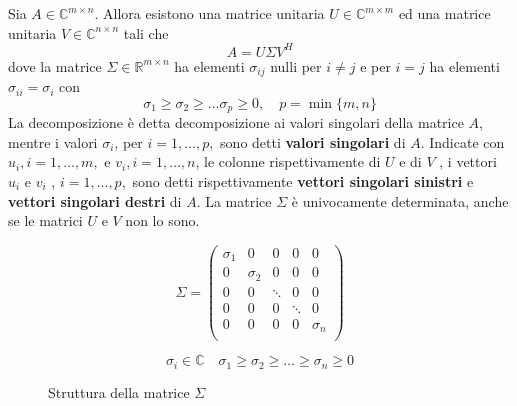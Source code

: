 
\begin{theo} Sia $A \in \mathbb{C}^{m \times n}$. Allora esistono una matrice
unitaria $U \in \mathbb{C}^{m \times m}$ ed una matrice unitaria $V
\in \mathbb{C}^{n \times n}$ tali che
\begin{equation}
  \label{eq:06minq09} A = U \Sigma V^{H}
\end{equation} dove la matrice $\Sigma \in \mathbb{R}^{m \times n}$ ha
elementi $\sigma_{ij}$ nulli per $i \neq j$ e per $i =j$ ha elementi
$\sigma_{ii} = \sigma_i$ con
$$
\sigma_1 \geq \sigma_2 \geq \ldots \sigma_p \geq 0, \quad p =
\min\{m,n\}
$$
La decomposizione \`e detta decomposizione ai valori singolari della
matrice $A$, mentre i valori $\sigma_i$, per $i = 1, \ldots , p,$ sono
detti \textbf{valori singolari} di $A$. Indicate con $u_i , i = 1,
\ldots , m,$ e $v_i , i = 1, \ldots , n$, le colonne rispettivamente
di $ U$ e di $ V$ , i vettori $u_i$ e $v_i$ , $i = 1, \ldots , p,$ sono
detti rispettivamente \textbf{vettori singolari sinistri} e
\textbf{vettori singolari destri} di $A$.  La matrice $\Sigma$ \`e
univocamente determinata, anche se le matrici $U$ e $V$ non lo sono.
\end{theo}

\begin{figure}[hb] \centering
$$
\Sigma =
\begin{pmatrix} 
  \sigma_1 & 0        & 0      & 0      & 0        \\ 
  0        & \sigma_2 & 0      & 0      & 0        \\
  0        & 0        & \ddots & 0      & 0        \\ 
  0        & 0        & 0      & \ddots & 0        \\ 
  0        & 0        & 0      & 0      & \sigma_n \\
\end{pmatrix} $$

$$ \sigma_i \in \mathbb{C}
\quad \sigma_1 \geq \sigma_2 \geq \ldots \geq \sigma_n \geq 0$$
\caption[Struttura della matrice $\Sigma$]{Struttura della matrice
  $\Sigma$}
\end{figure}

